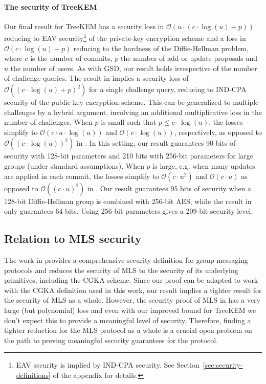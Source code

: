 \paragraph{The security of TreeKEM} Our final result for TreeKEM has a security loss in $\mathcal{O}(u \cdot (c \cdot \log(u) + p))$ reducing to EAV security\footnote{EAV security is implied by IND-CPA security. See Section~\ref{sec:security-definitions} of the appendix for details.} of the private-key encryption scheme  and a loss in $\mathcal{O}(c \cdot \log(u) + p)$ reducing to the hardness of the Diffie-Hellman problem, where $c$ is the number of commits, $p$ the number of add or update proposals and $u$ the number of users. As with GSD, our result holds irrespective of the number of challenge queries. The result in \cite{ttkem} implies a security loss of $\mathcal{O}((c \cdot \log(u) + p)^2)$ for a single challenge query, reducing to IND-CPA security of the public-key encryption scheme. This can be generalized to multiple challenges by a hybrid argument, involving an additional multiplicative loss in the number of challenges.
When $p$ is small such that $p \le c \cdot \log(u)$, the losses simplify to $\mathcal{O}(c \cdot u \cdot \log(u))$ and $\mathcal{O}(c \cdot \log(u))$, respectively, as opposed to $\mathcal{O}((c \cdot \log(u))^2)$ in \cite{ttkem}. In this setting, our result guarantees 90 bits of security with 128-bit parameters and 210 bits with 256-bit parameters for large groups (under standard assumptions).
When $p$ is large, e.g. when many updates are applied in each commit, the losses simplify to $\mathcal{O}(c \cdot u^2)$ and $\mathcal{O}(c \cdot u)$ as opposed to $\mathcal{O}((c \cdot u)^2)$ in \cite{ttkem}. Our result guarantees 95 bits of security when a 128-bit Diffie-Hellman group is combined with 256-bit AES, while the result in \cite{ttkem} only guarantees 64 bits. Using 256-bit parameters gives a 209-bit security level.

\subsection{Relation to MLS security}
The work in \cite{modular-group-messaging} provides a comprehensive security definition for group messaging protocols and reduces the security of MLS to the security of its underlying primitives, including the CGKA scheme. Since our proof can be adapted to work with the CGKA definition used in this work, our result implies a tighter result for the security of MLS as a whole. However, the security proof of MLS in \cite{modular-group-messaging} has a very large (but polynomial) loss and even with our improved bound for TreeKEM we don't expect this to provide a meaningful level of security. Therefore, finding a tighter reduction for the MLS protocol as a whole is a crucial open problem on the path to proving meaningful security guarantees for the protocol.
